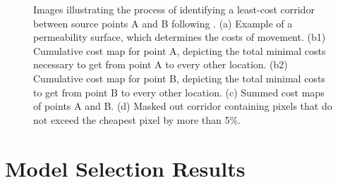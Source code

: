 \documentclass[abstract=off,10pt,a4paper,bibliography=totocnumbered]{article}
\begin{document}
\begin{figure}[hbtp]
\begin{center}
  \caption{Images illustrating the process of identifying a least-cost corridor
  between source points A and B following \cite{Pinto.2009}. (a) Example of a
  permeability surface, which determines the costs of movement. (b1) Cumulative
  cost map for point A, depicting the total minimal costs necessary to get from
  point A to every other location. (b2) Cumulative cost map for point B,
  depicting the total minimal costs to get from point B to every other location.
  (c) Summed cost maps of points A and B. (d) Masked out corridor containing
  pixels that do not exceed the cheapest pixel by more than 5\%.}
  \label{LCCExample}
  \end{center}
\end{figure}

\newpage
\section{Model Selection Results}
\end{document}
